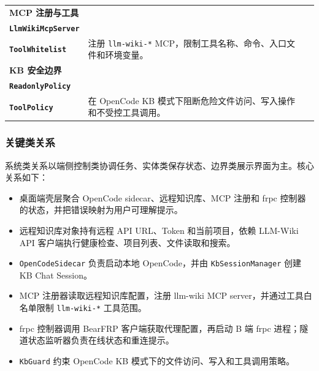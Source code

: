 \documentclass[UTF8,a4paper,12pt,fontset=fandol]{ctexart}
\newcommand{\code}[1]{\texttt{\footnotesize #1}}
\begin{document}
\begin{longtable}{>{\bfseries}p{3.4cm}p{4.2cm}p{6.4cm}}
MCP 注册与工具 & \begin{tabular}[t]{@{}l@{}}\code{McpRegistry}\\\code{LlmWikiMcpServer}\\\code{ToolWhitelist}\end{tabular} & 注册 \code{llm-wiki-*} MCP，限制工具名称、命令、入口文件和环境变量。 \\
KB 安全边界 & \begin{tabular}[t]{@{}l@{}}\code{KbGuard}\\\code{ReadonlyPolicy}\\\code{ToolPolicy}\end{tabular} & 在 OpenCode KB 模式下阻断危险文件访问、写入操作和不受控工具调用。 \\
\bottomrule
\end{longtable}

\subsubsection{关键类关系}
系统类关系以端侧控制类协调任务、实体类保存状态、边界类展示界面为主。核心关系如下：
\begin{itemize}
  \item 桌面端壳层聚合 OpenCode sidecar、远程知识库、MCP 注册和 frpc 控制器的状态，并把错误映射为用户可理解提示。
  \item 远程知识库对象持有远程 API URL、Token 和当前项目，依赖 LLM-Wiki API 客户端执行健康检查、项目列表、文件读取和搜索。
  \item \code{OpenCodeSidecar} 负责启动本地 OpenCode，并由 \code{KbSessionManager} 创建 KB Chat Session。
  \item MCP 注册器读取远程知识库配置，注册 llm-wiki MCP server，并通过工具白名单限制 \code{llm-wiki-*} 工具范围。
  \item frpc 控制器调用 BearFRP 客户端获取代理配置，再启动 B 端 frpc 进程；隧道状态监听器负责在线状态和重连提示。
  \item \code{KbGuard} 约束 OpenCode KB 模式下的文件访问、写入和工具调用策略。
\end{itemize}
\end{document}
